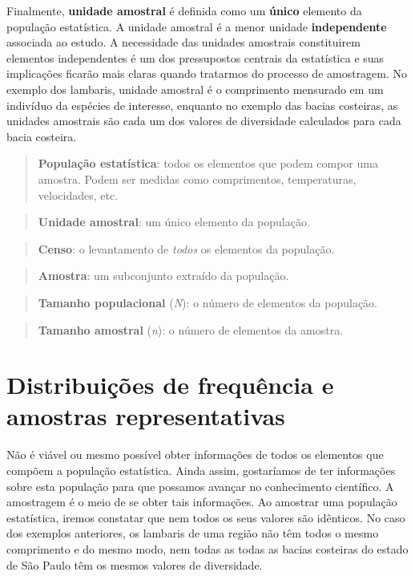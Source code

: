 \documentclass[
]{book}
\begin{document}
Finalmente, \textbf{unidade amostral} é definida como um \textbf{único} elemento da população estatística. A unidade amostral é a menor unidade \textbf{independente} associada ao estudo. A necessidade das unidades amostrais constituirem elementos independentes é um dos pressupostos centrais da estatística e suas implicações ficarão mais claras quando tratarmos do processo de amostragem. No exemplo dos lambaris, unidade amostral é o comprimento mensurado em um indivíduo da espécies de interesse, enquanto no exemplo das bacias costeiras, as unidades amostrais são cada um dos valores de diversidade calculados para cada bacia costeira.

\begin{quote}
\textbf{População estatística}: todos os elementos que podem compor uma amostra. Podem ser medidas como comprimentos, temperaturas, velocidades, etc.
\end{quote}

\begin{quote}
\textbf{Unidade amostral}: um único elemento da população.
\end{quote}

\begin{quote}
\textbf{Censo}: o levantamento de \emph{todos} os elementos da população.
\end{quote}

\begin{quote}
\textbf{Amostra}: um subconjunto extraído da população.
\end{quote}

\begin{quote}
\textbf{Tamanho populacional} (\emph{N}): o número de elementos da população.
\end{quote}

\begin{quote}
\textbf{Tamanho amostral} (\emph{n}): o número de elementos da amostra.
\end{quote}

\hypertarget{distribuiuxe7uxf5es-de-frequuxeancia-e-amostras-representativas}{%
\section{Distribuições de frequência e amostras representativas}\label{distribuiuxe7uxf5es-de-frequuxeancia-e-amostras-representativas}}

Não é viável ou mesmo possível obter informações de todos os elementos que compõem a população estatística. Ainda assim, gostaríamos de ter informações sobre esta população para que possamos avançar no conhecimento científico. A amostragem é o meio de se obter tais informações. Ao amostrar uma população estatística, iremos constatar que nem todos os seus valores são idênticos. No caso dos exemplos anteriores, os lambaris de uma região não têm todos o mesmo comprimento e do mesmo modo, nem todas as todas as bacias costeiras do estado de São Paulo têm os mesmos valores de diversidade.
\end{document}

